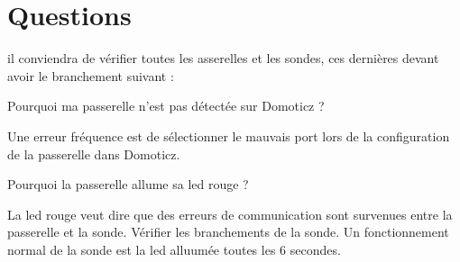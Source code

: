 \chapter{Questions}

il conviendra de vérifier toutes les asserelles et les sondes, ces dernières devant avoir le branchement suivant : 



\begin{question} 
  Pourquoi ma passerelle n'est pas détectée sur Domoticz ?
\end{question}

\begin{reponse}
 Une erreur fréquence est de sélectionner le mauvais port lors de la configuration de la passerelle dans Domoticz.\\
\end{reponse}


\begin{question} 
  Pourquoi la passerelle allume sa led rouge ?
\end{question}

\begin{reponse}
 La led rouge veut dire que des erreurs de communication sont survenues entre la passerelle et la sonde. Vérifier les branchements de la sonde. Un fonctionnement normal de la sonde est la led alluumée toutes les 6 secondes.
\end{reponse}





